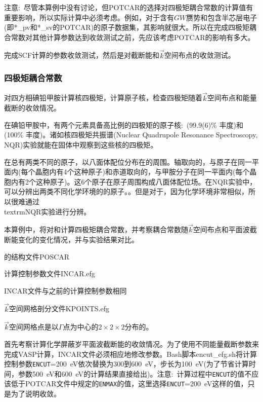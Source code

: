 注意:~尽管本算例中没有讨论，但\textrm{POTCAR}的选择对四极矩耦合常数的计算值有重要影响，所以实际计算中必须考虑。例如，对于含有$GW$赝势和包含半芯层电子(即\textrm{*\_pv}和\textrm{*\_sv}的\textrm{POTCAR})的原子数据集，其影响就很大。所以在完成四极矩耦合常数对其他计算参数达到收敛测试之前，先应该考虑\textrm{POTCAR}的影响有多大。

完成\textrm{SCF}计算的参数收敛测试，然后是对截断能和$\vec k$空间布点的收敛测试。

\subsubsection{四极矩耦合常数}
对四方相碘铅甲胺计算核四极矩，计算原子核，检查四极矩随着$\vec k$空间布点和能量截断的收敛情况。

在碘铅甲胺中，有两个元素具备高比例的四极矩的原子核:~(99.9(6)\% 丰度)和(100\% 丰度)。诸如核四极矩共振谱\textrm{(Nuclear Quadrupole Resonance Spectroscopy, NQR)}实验就能在固体中观察到这些核的四极矩。

在总有两类不同的原子，以八面体配位分布在的周围。轴取向的，与原子在同一平面内(每个晶胞内有4个这种原子)和赤道取向的，与甲胺分子在同一平面内(每个晶胞内有2个这种原子)。这6个原子在原子周围构成八面体配位场。在\textrm{NQR}实验中，可以分辨出两类不同化学环境的的原子。。但是对于，因为化学环境非常相似，所以很难通过\\textrm{NQR}实验进行分辨。

本算例中，将对和计算四极矩耦合常数，并考察耦合常数随$\vec k$空间布点和平面波截断能变化的变化情况，并与实验结果对比。

的结构文件\textrm{POSCAR}

计算控制参数文件\textrm{INCAR.efg}

\textrm{INCAR}文件与之前的计算控制参数相同

$\vec k$空间网格剖分文件\textrm{KPOINTS.efg}

$\vec k$空间网格点是以$\Gamma$点为中心的$2\times2\times2$分布的。

首先考察计算化学屏蔽岁平面波截断能的收敛情况。为了使用不同能量截断参数来完成\textrm{VASP}计算，\textrm{INCAR}文件必须相应地修改参数。\textrm{Bash}脚本\textrm{encut\_efg.sh}将计算控制参数\texttt{ENCUT}=\textrm{200~eV}依次替换为300到\textrm{600~eV}，步长为\textrm{100~eV}(为了节省计算时间，参数\textrm{500~eV}和\textrm{600~eV}的计算结果直接给出)。注意:~计算过程中\texttt{ENCUT}的值不应该低于\textrm{POTCAR}文件中规定的\texttt{ENMAX}的值，这里选择\texttt{ENCUT}=\textrm{200~eV}这样的值，只是为了说明收敛。

